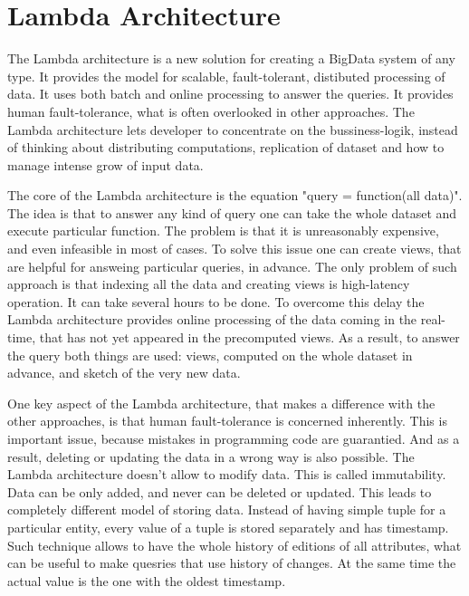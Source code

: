 \chapter{Lambda Architecture}
\label{chap:lambda_architecture}

The Lambda architecture \cite{MarzWarren201401} is a new solution
for creating a BigData system of any type. It provides the model for scalable, fault-tolerant, distibuted processing
of data. It uses both batch and online processing to answer the queries. It
provides human fault-tolerance, what is often overlooked in other approaches.
The Lambda architecture lets developer to concentrate on the bussiness-logik,
instead of thinking about distributing computations, replication of dataset and
how to manage intense grow of input data.

The core of the Lambda architecture is the equation "query = function(all
data)". The idea is that to answer any kind of query one can take the whole
dataset and execute particular function. The problem is that it is unreasonably
expensive, and even infeasible in most of cases. To solve this issue one can
create views, that are helpful for answeing particular queries, in advance. The
only problem of such approach is that indexing all the data and creating views
is high-latency operation. It can take several hours to be done. To overcome
this delay the Lambda architecture provides online processing of the data coming
in the real-time, that has not yet appeared in the precomputed views. As a
result, to answer the query both things are used: views, computed on the whole
dataset in advance, and sketch of the very new data.

One key aspect of the Lambda architecture, that makes a difference with the
other approaches, is that human fault-tolerance is concerned inherently. This is
important issue, because mistakes in programming code are guarantied. And as a
result, deleting or updating the data in a wrong way is also possible. The Lambda
architecture doesn't allow to modify data. This is called 
immutability. Data can be only added, and never can be deleted or updated. This
leads to completely different model of storing data. Instead of having simple
tuple for a particular entity, every value of a tuple is stored separately and
has timestamp. Such technique allows to have the whole history of editions of
all attributes, what can be useful to make quesries that use history of changes.
At the same time the actual value is the one with the oldest timestamp.

